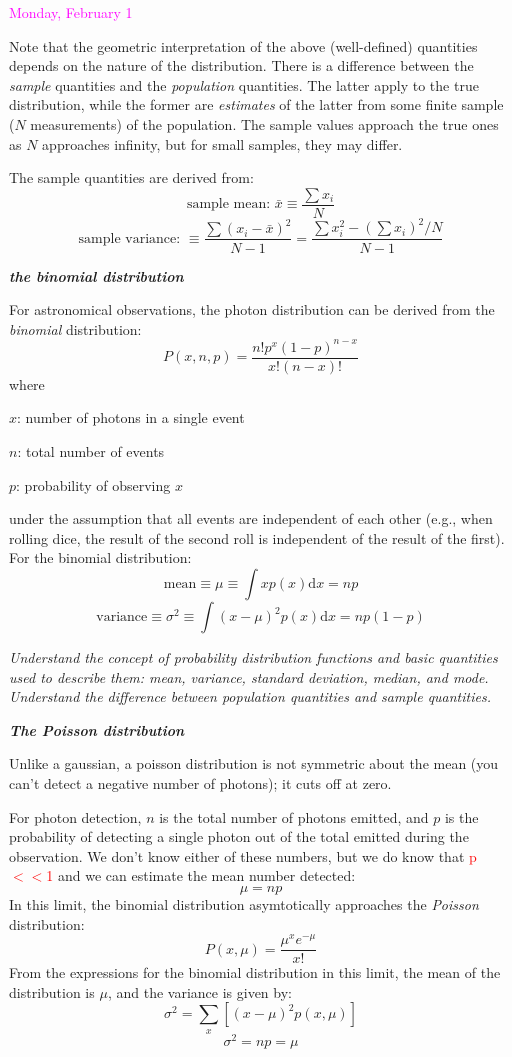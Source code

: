 \documentclass[12pt]{article}
\begin{document}
\textcolor{magenta}{Monday, February 1}

Note that the geometric interpretation of the above (well-defined)
quantities depends on the nature of the distribution.
There is a difference between the \emph{sample} quantities
and the \emph{population} quantities. The latter apply
to the true distribution, while the former are \emph{estimates} of the latter
from some finite sample ($N$ measurements) of the population.
The sample values approach the true ones as $N$
approaches infinity, but for small samples, they may differ.

The sample quantities are derived from:
$$\textrm{sample\ mean:\ } \bar{x} \equiv \frac{\sum x_i}{N}$$
$$\textrm{sample\ variance:\ } \equiv
  \frac{\sum (x_i-\bar{x})^2}{N-1} =
  \frac{\sum x_i^2-(\sum x_i)^2/N}{N-1}$$

\textbf{\emph{the binomial distribution}}

For astronomical observations, the photon distribution can be derived from the
\emph{binomial} distribution:
   $$ P(x,n,p) = \frac{n!p^x(1-p)^{n-x}}{x!(n-x)!}  $$
where
\begin{itemize*}
    \item $x$: number of photons in a single event
    \item $n$: total number of events
    \item $p$: probability of observing $x$
\end{itemize*}
under the assumption that all events are independent of each other
(e.g., when rolling dice, the result of the second roll is independent
of the result of the first). For the binomial distribution:
   $$ \textrm{mean} \equiv \mu \equiv \int xp(x)\textrm{d}x = np $$
   $$ \textrm{variance} \equiv \sigma^2 \equiv
      \int (x-\mu)^2p(x)\textrm{d}x = np(1-p) $$

\textcolor{om}{\emph{Understand the concept of probability
distribution functions and basic quantities used to describe them:
mean, variance, standard deviation, median, and mode. Understand the
difference between population quantities and sample quantities.}}

\textbf{\emph{The Poisson distribution}}

Unlike a gaussian, a poisson distribution is not
symmetric about the mean (you can't detect a negative number of
photons); it cuts off at zero.

For photon detection, $n$ is the total number of
photons emitted, and $p$ is the probability of detecting a
single photon out of the total emitted during the observation.
We don't know either of these numbers, but we do know that
\textcolor{red}{p$<<$1} and we can estimate the mean number detected:
  $$  \mu = np $$
In this limit, the binomial distribution asymtotically approaches the
\emph{Poisson} distribution:
   $$  P(x,\mu) = \frac{\mu^x e^{-\mu}}{x!} $$
From the expressions for the binomial distribution in this limit, the
mean of the distribution is $\mu$, and the variance is given by:
  $$  \sigma^{2} = \sum_x [(x-\mu)^2p(x,\mu)] $$
  $$  \sigma^{2} = np = \mu  $$
\end{document}
